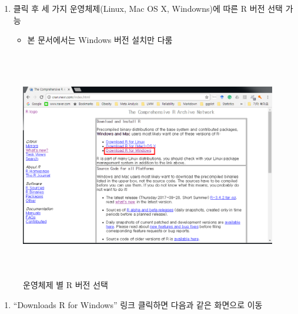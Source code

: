 \documentclass[12pt,a4paper]{book}
\providecommand{\tightlist}{%
  \setlength{\itemsep}{0pt}\setlength{\parskip}{0pt}}
\theoremstyle{definition}
\theoremstyle{definition}
\theoremstyle{definition}
\theoremstyle{remark}
\begin{document}
\begin{enumerate}
\def\labelenumi{\arabic{enumi}.}
\setcounter{enumi}{3}
\tightlist
\item
  클릭 후 세 가지 운영체제(Linux, Mac OS X, Windowns)에 따른 R 버전 선택
  가능

  \begin{itemize}
  \tightlist
  \item
    본 문서에서는 Windows 버전 설치만 다룸
  \end{itemize}
\end{enumerate}

\begin{figure}[H]
{
  \centering
  \includegraphics[width = 12cm, height = 10cm]{Figures/Rinstall-01.png}
  \caption[운영체제 별 R 버전 선택]{운영체제 별 R 버전 선택}\label{fig:R-install-03}
}
\end{figure}

\begin{enumerate}
\def\labelenumi{\arabic{enumi}.}
\setcounter{enumi}{4}
\tightlist
\item
  ``Downloads R for Windows'' 링크 클릭하면 다음과 같은 화면으로 이동
\end{enumerate}
\end{document}
